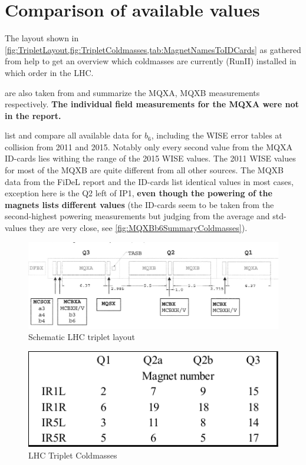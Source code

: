 \section{Comparison of available values}
The layout shown in \cref{fig:TripletLayout,fig:TripletColdmasses,tab:MagnetNamesToIDCards} 
as gathered from \cite{TodescoFidelReportPartII, TodescoB4MQXAMQXB2020}
help to get an overview which coldmasses are currently (RunII) installed in which order in the LHC.


 are also taken from \cite{TodescoFidelReportPartII}
and summarize the MQXA, MQXB measurements respectively. 
\textbf{The individual field measurements for the MQXA were not in the report.}


 list and compare all available data for $b_6$,
including the WISE error tables at collision from 2011\cite{WiseErrorTables2011} 
and 2015\cite{WiseErrorTables2015}.
Notably only every second value from the MQXA ID-cards lies withing the range of the 2015 WISE values.
The 2011 WISE values for most of the MQXB are quite different from all other sources.
The MQXB data from the FiDeL report and the ID-cards list identical values in most cases,
exception here is the Q2 left of IP1, \textbf{even though the powering of the magnets lists
different values} (the ID-cards seem to be taken from the second-highest powering measurements
but judging from the average and std-values they are very close, 
see \cref{fig:MQXBb6SummaryColdmasses}).



\newcommand{\warn}[1]{\textcolor{CernOrange}{#1}}


\begin{figure}[h!]
    \centering
    \includegraphics[width=\textwidth]{images/lhc_triplet_layout.jpg}
    \caption{Schematic LHC triplet layout}
    \label{fig:TripletLayout}
\end{figure}

\begin{figure}[h!]
    \centering
    \includegraphics[width=.5\textwidth]{images/lhc_coldmass_layout.pdf}
    \caption{LHC Triplet Coldmasses}
    \label{fig:TripletColdmasses}
\end{figure}

